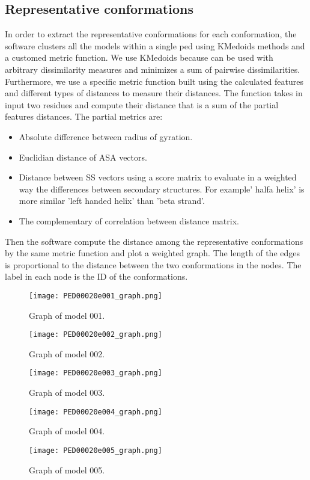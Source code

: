 \subsection{Representative conformations} 
In order to extract the representative conformations for each conformation, the software clusters all the models within a single ped using KMedoids methods and a customed metric function. 
We use KMedoids because can be used with arbitrary dissimilarity measures and minimizes a sum of pairwise dissimilarities. 
Furthermore, we use a specific metric function built using the calculated features and different types of distances to measure their distances. The function takes in input two residues and compute their distance that is a sum of the partial features distances.
The partial metrics are: 
\begin{itemize}
\item Absolute difference between radius of gyration.
\item Euclidian distance of ASA vectors.
\item Distance between SS vectors using a score matrix to evaluate in a weighted way the differences between secondary structures. For example' halfa helix' is more similar 'left handed helix' than 'beta strand'. 
\item The complementary of correlation between distance matrix. 
\end{itemize}

Then the software compute the distance among the representative conformations by the same metric function and plot a weighted graph. The length of the edges is proportional to the distance between the two conformations in the nodes. The label in each node is the ID of the conformations.

\begin{figure}[H]
	\begin{minipage}[b]{0.47\textwidth}
		\centering
		\texttt{[image: PED00020e001\_graph.png]}
		\caption{Graph of model 001.}
		\label{model001}
	\end{minipage}
	\hfill
	\begin{minipage}[b]{0.47\textwidth}
		\centering
		\texttt{[image: PED00020e002\_graph.png]}
		\caption{Graph of model 002.}
		\label{model002}
	\end{minipage}
	\hfill
	\begin{minipage}[b]{0.47\textwidth}
		\centering
		\texttt{[image: PED00020e003\_graph.png]}
		\caption{Graph of model 003.}
		\label{model003}
	\end{minipage}
	\begin{minipage}[b]{0.47\textwidth}
		\centering
		\texttt{[image: PED00020e004\_graph.png]}
		\caption{Graph of model 004.}
		\label{model004}
	\end{minipage}
	\hfill
	\begin{minipage}[b]{0.47\textwidth}
		\centering
		\texttt{[image: PED00020e005\_graph.png]}
		\caption{Graph of model 005.}
		\label{model005}
	\end{minipage}
	\end{figure}

